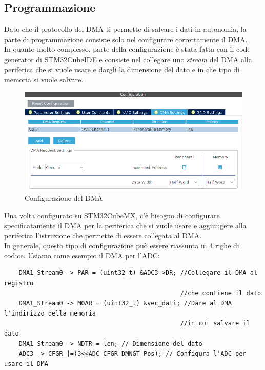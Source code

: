 \subsection{Programmazione}
Dato che il protocollo del DMA ti permette di salvare i dati in autonomia, la parte di programmazione consiste solo nel configurare correttamente il DMA.\\

In quanto molto complesso, parte della configurazione è stata fatta con il code generator di STM32CubeIDE e consiste nel collegare uno \textit{stream} del DMA alla periferica che si vuole usare e dargli la dimensione del dato e in che tipo di memoria si vuole salvare.\\

\begin{figure}
    \centering
    \includegraphics[width=\linewidth]{microcontrollore/assets/dma_configuration.png}
    \caption{Configurazione del DMA}
    \label{fig:DMA}
\end{figure}

Una volta configurato su STM32CubeMX, c'è bisogno di configurare specificatamente il DMA per la periferica che si vuole usare e aggiungere alla periferica l'istruzione che permette di essere collegata al DMA.\\

In generale, questo tipo di configurazione può essere riassunta in 4 righe di codice. Usiamo come esempio il DMA per l'ADC:

\begin{verbatim}
    DMA1_Stream0 -> PAR = (uint32_t) &ADC3->DR; //Collegare il DMA al registro
                                                //che contiene il dato
    DMA1_Stream0 -> M0AR = (uint32_t) &vec_dati; //Dare al DMA l'indirizzo della memoria
                                                //in cui salvare il dato
    DMA1_Stream0 -> NDTR = len; // Dimensione del dato
    ADC3 -> CFGR |=(3<<ADC_CFGR_DMNGT_Pos); // Configura l'ADC per usare il DMA
\end{verbatim}

